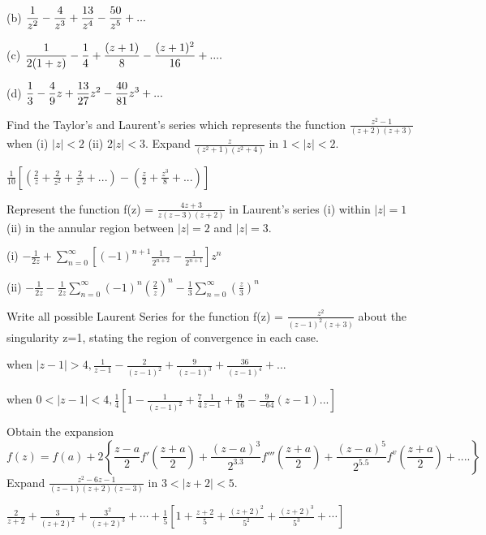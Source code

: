 \begin{problems}
\begin{sol}
(b) $\displaystyle \frac{1}{z^{2}}-\frac{4}{z^{3}}+\frac{13}{z^{4}}-\frac{50}{z^{5}}+...$

(c) $\displaystyle \frac{1}{2(1+z)}-\frac{1}{4}+\frac{(z+1)}{8}-\frac{(z+1)^{2}}{16}+....$

(d) $\displaystyle \frac{1}{3}-\frac{4}{9}z+\frac{13}{27}z^{2}-\frac{40}{81}z^{3}+...$
\end{sol}
\prob Find the Taylor's and Laurent's series which represents the function $\frac{z^2-1}{(z+2)(z+3)}$ when (i) $|z|<2$  (ii) $2|z|<3$.
\prob Expand $\frac{z}{(z^2+1)(z^2+4)}$ in $1<|z|<2$.
\begin{sol}
$\frac{1}{10}[(\frac{2}{z}+\frac{2}{z^{2}}+\frac{2}{z^{5}}+...)-(\frac{z}{2}+\frac{z^{3}}{8}+...)]$
\end{sol}
\prob Represent the function f(z) = $\frac{4z+3}{z(z-3)(z+2)}$ in Laurent's series (i) within $|z|=1$ (ii) in the annular region between $|z|=2$ and $|z|=3$.
\begin{sol}
(i) $-\frac{1}{2z}+\sum_{n=0}^{\infty}\left[(-1)^{n+1}\frac{1}{2^{n+2}}-\frac{1}{2^{n+1}}\right]z^{n}$ 

(ii) $-\frac{1}{2z}-\frac{1}{2z}\sum_{n=0}^{\infty}(-1)^{n}(\frac{2}{z})^{n}-\frac{1}{3}\sum_{n=0}^{\infty}(\frac{z}{3})^{n}$

\end{sol}
\prob Write all possible Laurent Series for the function f(z) = $\frac{z^2}{(z-1)^2(z+3)}$ about the singularity z=1, stating the region of convergence in each case.
\begin{sol}
when $|z-1|>4,\frac{1}{z-1}-\frac{2}{(z-1)^{2}}+\frac{9}{(z-1)^{3}}+\frac{36}{(z-1)^{4}}+...$ 

when $0<|z-1|<4,\frac{1}{4}[1-\frac{1}{(z-1)^{2}}+\frac{7}{4}\frac{1}{z-1}+\frac{9}{16}-\frac{9}{-64}(z-1)...]$
\end{sol}
\prob Obtain the expansion
\[f(z) = f(a)+ 2\left\{\frac{z-a}{2}f'\left(\frac{z+a}{2}\right)+\frac{(z-a)^3}{2^3.3}f'''\left(\frac{z+a}{2}\right) + \frac{(z-a)^5}{2^5.5} f^v\left(\frac{z+a}{2}\right)+....\right\}\]
\prob Expand $\frac{z^2-6z-1}{(z-1)(z+2)(z-3)}$ in $3<|z+2|<5$.
\begin{sol}
$\frac{2}{z+2}+\frac{3}{(z+2)^{2}}+\frac{3^{2}}{(z+2)^{3}}+\cdots+\frac{1}{5}\left[1+\frac{z+2}{5}+\frac{(z+2)^{2}}{5^{2}}+\frac{(z+2)^{3}}{5^{3}}+\cdots\right]$
\end{sol}
\end{problems}
